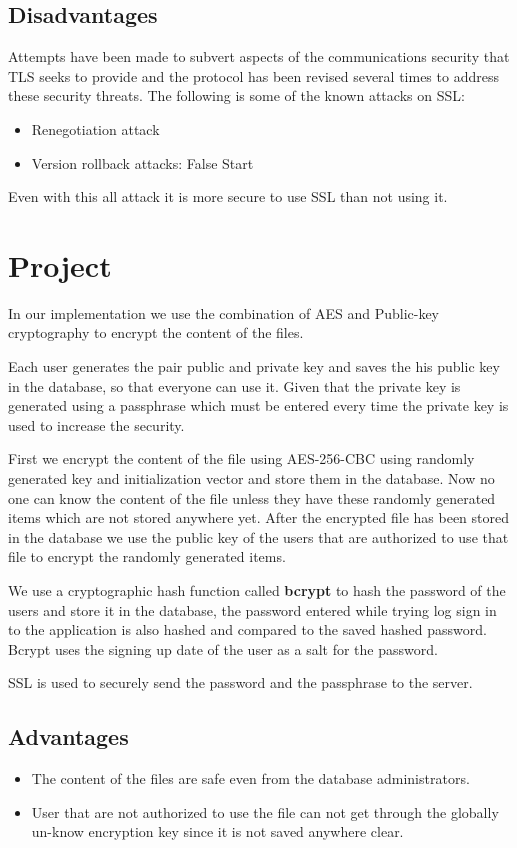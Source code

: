 \subsection{Disadvantages}
Attempts have been made to subvert aspects of the communications security that TLS seeks to provide and the protocol has been revised several times to address these security threats. The following is some of the known attacks on SSL:
\begin{itemize}
	\item Renegotiation attack
	\item Version rollback attacks: False Start
\end{itemize}
Even with this all attack it is more secure to use SSL than not using it.

\section{Project}
\par In our implementation we use the combination of AES and Public-key cryptography to encrypt the content of the files.
\par Each user generates the pair public and private key and saves the his public key in the database, so that everyone can use it. Given that the private key is generated using a passphrase which must be entered every time the private key is used to increase the security.
\par First we encrypt the content of the file using AES-256-CBC using randomly generated key and initialization vector and store them in the database. Now no one can know the content of the file unless they have these randomly generated items which are not stored anywhere yet. After the encrypted file has been stored in the database we use the public key of the users that are authorized to use that file to encrypt the randomly generated items.

\par We use a cryptographic hash function called \textbf{bcrypt} to hash the password of the users and store it in the database, the password entered while trying log sign in to the application is also hashed and compared to the saved hashed password. Bcrypt uses the signing up date of the user as a salt for the password.
\par SSL is used to securely send the password and the passphrase to the server.
\subsection{Advantages}
\begin{itemize}
	\item The content of the files are safe even from the database administrators.
	\item User that are not authorized to use the file can not get through the globally un-know encryption key since it is not saved anywhere clear.
\end{itemize}
